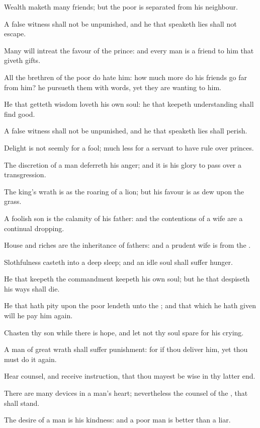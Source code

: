 \Verse Wealth maketh many friends; but the poor is separated from his neighbour.

\Verse A false witness shall not be unpunished, and he that speaketh lies shall not escape.

\Verse Many will intreat the favour of the prince: and every man is a friend to him that giveth gifts.

\Verse All the brethren of the poor do hate him: how much more do his friends go far from him? he pursueth them with words, yet they are wanting to him.

\Verse He that getteth wisdom loveth his own soul: he that keepeth understanding shall find good.

\Verse A false witness shall not be unpunished, and he that speaketh lies shall perish.

\Verse Delight is not seemly for a fool; much less for a servant to have rule over princes.

\Verse The discretion of a man deferreth his anger; and it is his glory to pass over a transgression.

\Verse The king's wrath is as the roaring of a lion; but his favour is as dew upon the grass.

\Verse A foolish son is the calamity of his father: and the contentions of a wife are a continual dropping.

\Verse House and riches are the inheritance of fathers: and a prudent wife is from the \LORD.

\Verse Slothfulness casteth into a deep sleep; and an idle soul shall suffer hunger.

\Verse He that keepeth the commandment keepeth his own soul; but he that despiseth his ways shall die.

\Verse He that hath pity upon the poor lendeth unto the \LORD; and that which he hath given will he pay him again.

\Verse Chasten thy son while there is hope, and let not thy soul spare for his crying.

\Verse A man of great wrath shall suffer punishment: for if thou deliver him, yet thou must do it again.

\Verse Hear counsel, and receive instruction, that thou mayest be wise in thy latter end.

\Verse There are many devices in a man's heart; nevertheless the counsel of the \LORD, that shall stand.

\Verse The desire of a man is his kindness: and a poor man is better than a liar.

